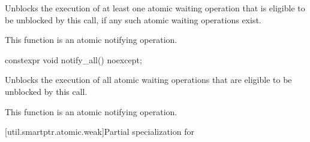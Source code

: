 \begin{itemdescr}
\pnum
\effects
Unblocks the execution of at least one atomic waiting operation
that is eligible to be unblocked by this call,
if any such atomic waiting operations exist.

\pnum
\remarks
This function is an atomic notifying operation.
\end{itemdescr}

%
\begin{itemdecl}
constexpr void notify_all() noexcept;
\end{itemdecl}

\begin{itemdescr}
\pnum
\effects
Unblocks the execution of all atomic waiting operations
that are eligible to be unblocked by this call.

\pnum
\remarks
This function is an atomic notifying operation.
\end{itemdescr}

[util.smartptr.atomic.weak]{Partial specialization for }


